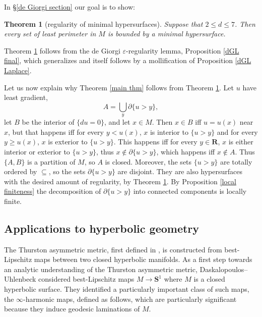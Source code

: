 \documentclass[reqno,12pt,letterpaper]{amsart}
\newcommand{\RR}{\mathbf{R}}
\newcommand{\Sph}{\mathbf S}
\newtheorem{theorem}{Theorem}[section]
\theoremstyle{definition}
\numberwithin{equation}{section}
\begin{document}
In \S\ref{de Giorgi section} our goal is to show:

\begin{theorem}[regularity of minimal hypersurfaces]\label{main lma}
Suppose that $2 \leq d \leq 7$.
Then every set of least perimeter in $M$ is bounded by a minimal hypersurface.
\end{theorem}

Theorem \ref{main lma} follows from the de Giorgi $\varepsilon$-regularity lemma, Proposition \ref{dGL final}, which generalizes \cite[Teorema 5.7]{Miranda66} and itself follows by a mollification of Proposition \ref{dGL Laplace}.

Let us now explain why Theorem \ref{main thm} follows from Theorem \ref{main lma}.
Let $u$ have least gradient,
\begin{equation}\label{lamination union}
A = \bigcup_y \partial \{u > y\},
\end{equation}
let $B$ be the interior of $\{du = 0\}$, and let $x \in M$.
Then $x \in B$ iff $u = u(x)$ near $x$, but that happens iff for every $y < u(x)$, $x$ is interior to $\{u > y\}$ and for every $y \geq u(x)$, $x$ is exterior to $\{u > y\}$.
This happens iff for every $y \in \RR$, $x$ is either interior or exterior to $\{u > y\}$, thus $x \notin \partial \{u > y\}$, which happens iff $x \notin A$.
Thus $\{A, B\}$ is a partition of $M$, so $A$ is closed.
Moreover, the sets $\{u > y\}$ are totally ordered by $\subseteq$, so the sets $\partial \{u > y\}$ are disjoint.
They are also hypersurfaces with the desired amount of regularity, by Theorem \ref{main lma}.
By Proposition \ref{local finiteness} the decomposition of $\partial \{u > y\}$ into connected components is locally finite.


\subsection{Applications to hyperbolic geometry}
The Thurston asymmetric metric, first defined in \cite{thurston1998minimal}, is constructed from best-Lipschitz maps between two closed hyperbolic manifolds.
As a first step towards an analytic understanding of the Thurston asymmetric metric, Daskalopoulos--Uhlenbeck \cite{daskalopoulos2020transverse} considered best-Lipschitz maps $M \to \Sph^1$ where $M$ is a closed hyperbolic surface.
They identified a particularly important class of such maps, the $\infty$-harmonic maps, defined as follows, which are particularly significant because they induce geodesic laminations of $M$.
\end{document}
